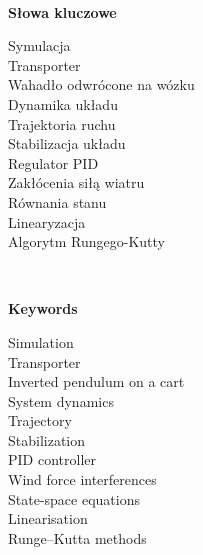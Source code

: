 \documentclass[12pt, twoside, openany]{report}
\theoremstyle{definition}
\begin{document}
\newpage
\pagestyle{empty}
$ $
\newpage


\newpage
\pagestyle{empty}
\vspace*{\fill}
\begin{center}
\LARGE\textbf{Słowa kluczowe}\\
\end{center}
\begin{center}
Symulacja\\
Transporter\\
Wahadło odwrócone na wózku\\
Dynamika układu\\
Trajektoria ruchu\\
Stabilizacja układu\\
Regulator PID\\
Zakłócenia siłą wiatru \\
Równania stanu\\
Linearyzacja\\
Algorytm Rungego-Kutty
\end{center}
\vspace{\fill}

\newpage
\pagestyle{empty}
$ $
\newpage

\newpage
\pagestyle{empty}
\vspace*{\fill}
\begin{center}
\LARGE\textbf{Keywords}\\
\end{center}
\begin{center}
Simulation\\
Transporter\\
Inverted pendulum on a cart\\
System dynamics\\
Trajectory\\
Stabilization\\
PID controller\\
Wind force interferences\\
State-space equations\\
Linearisation\\
Runge–Kutta methods
\end{center}
\vspace{\fill}

\newpage
\pagestyle{empty}
$ $
\newpage
\end{document}
